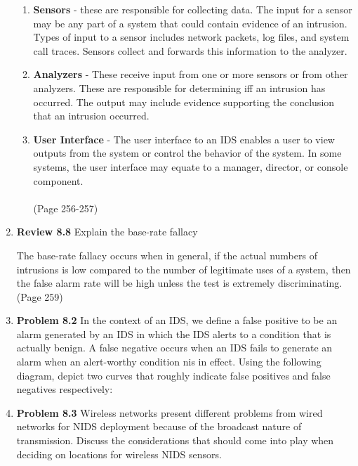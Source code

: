 \documentclass[12pt]{article}
\begin{document}
\begin{enumerate}
	\begin{enumerate}
 	 \item \textbf{Sensors}  - these are responsible for collecting data. The input for a sensor may be any part of a system that could contain evidence of an intrusion. Types of input to a sensor includes network packets, log files, and system call traces. Sensors collect and forwards this information to the analyzer. 
	 \item \textbf{Analyzers} - These receive input from one or more sensors or from other analyzers. These are responsible for determining iff an intrusion has occurred. The output may include evidence supporting the conclusion that an intrusion occurred. 
 	 \item \textbf{User Interface} - The user interface to an IDS enables a user to view outputs from the system or control the behavior of the system. In some systems, the user interface may equate to a manager, director, or console component. \\\\ (Page 256-257)
	\end{enumerate}
		
	\vspace{10pt}
	
	\item {\textbf{Review 8.8} Explain the base-rate fallacy }
	
	The base-rate fallacy occurs when in general, if the actual numbers of intrusions is low compared to the number of legitimate uses of a system, then the false alarm rate will be high unless the test is extremely discriminating. \\
	  (Page 259)
	

		
	\vspace{10pt}
	
	\item {\textbf{Problem 8.2} In the context of an IDS, we define a false positive to be an alarm generated by an IDS in which the IDS alerts to a condition that is actually benign. A false negative occurs when an IDS fails to generate an alarm when an alert-worthy condition nis in effect. Using the following diagram, depict two curves that roughly indicate false positives and false negatives respectively: } 

		
	\vspace{400pt}
	
	\item {\textbf{Problem 8.3} Wireless networks present different problems from wired networks for NIDS deployment because of the broadcast nature of transmission. Discuss the considerations that should come into play when deciding on locations for wireless NIDS sensors.}
	

\end{enumerate}
\end{document}
